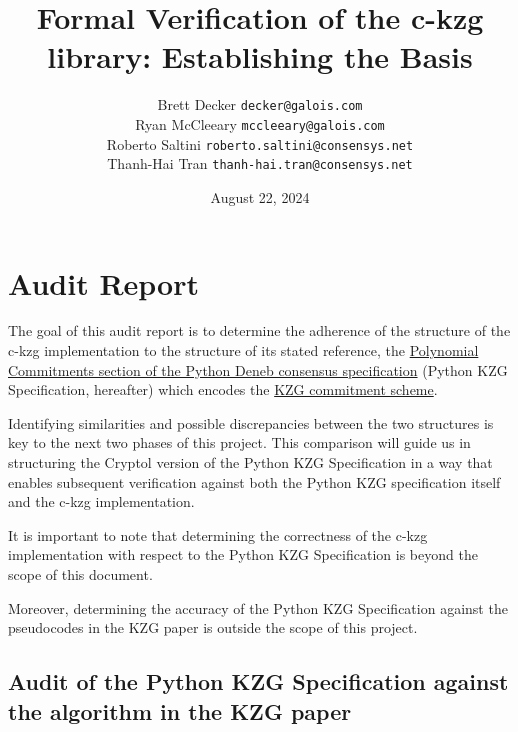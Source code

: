 \documentclass[12pt]{galois-whitepaper}
\author{Brett Decker \texttt{decker@galois.com}\\
Ryan McCleeary \texttt{mccleeary@galois.com}\\
Roberto Saltini \texttt{roberto.saltini@consensys.net}\\
Thanh-Hai Tran \texttt{thanh-hai.tran@consensys.net}
}
\title{Formal Verification of the c-kzg library: Establishing the Basis}
\date{August 22, 2024}
\begin{document}
\maketitle

\vspace*{2cm}

\newpage
\tableofcontents
\newpage

\section{Audit Report}
The goal of this audit report is to determine the adherence of the structure of the c-kzg implementation to the structure of its stated reference,
the \href{https://github.com/ethereum/consensus-specs/blob/dev/specs/deneb/polynomial-commitments.md}{Polynomial Commitments section of the Python Deneb consensus specification} (Python KZG Specification, hereafter) which encodes the \href{https://www.iacr.org/archive/asiacrypt2010/6477178/6477178.pdf}{KZG commitment scheme}.

Identifying similarities and possible discrepancies between the two structures is key to the next two phases of this project.
This comparison will guide us in structuring the Cryptol version of the Python KZG Specification in a way that enables subsequent verification against both the Python KZG specification itself and the c-kzg implementation.

It is important to note that determining the correctness of the c-kzg implementation with respect to the Python KZG Specification is beyond the scope of this document.

Moreover, determining the accuracy of the Python KZG Specification against the pseudocodes in the KZG paper is outside the scope of this project.

\subsection{Audit of the Python KZG Specification against the algorithm in the KZG paper}
\end{document}
